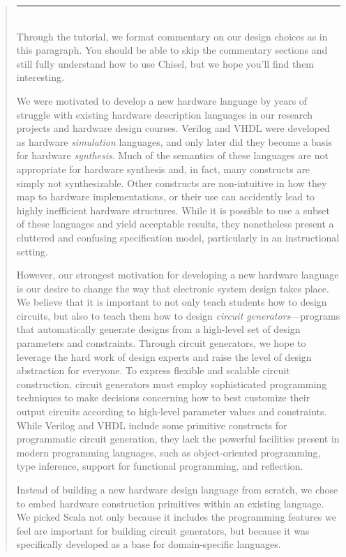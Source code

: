 \documentclass[twocolumn,10pt]{article}
\newenvironment{commentary}
{ \vspace{-0.1in}
  \begin{quotation}
  \noindent
  \small \em
  \rule{\linewidth}{1pt}\\
}
{
  \end{quotation}
}
\begin{document}
\begin{commentary}
Through the tutorial, we format commentary on our design choices as in
this paragraph.  You should be able to skip the commentary sections
and still fully understand how to use Chisel, but we hope you'll find
them interesting.

We were motivated to develop a new hardware language by years of
struggle with existing hardware description languages in our research
projects and hardware design courses.  Verilog and VHDL were developed
as hardware {\em simulation} languages, and only later did they become
a basis for hardware {\em synthesis}.  Much of the semantics of these
languages are not appropriate for hardware synthesis and, in fact,
many constructs are simply not synthesizable.  Other constructs are
non-intuitive in how they map to hardware implementations, or their
use can accidently lead to highly inefficient hardware structures.
While it is possible to use a subset of these languages and yield
acceptable results, they nonetheless present a cluttered and confusing
specification model, particularly in an instructional setting.

However, our strongest motivation for developing a new hardware
language is our desire to change the way that electronic system design
takes place.  We believe that it is important to not only teach
students how to design circuits, but also to teach them how to design
{\em circuit generators}---programs that automatically generate
designs from a high-level set of design parameters and constraints.
Through circuit generators, we hope to leverage the hard work of
design experts and raise the level of design abstraction for everyone.
To express flexible and scalable circuit construction, circuit
generators must employ sophisticated programming techniques to make
decisions concerning how to best customize their output circuits
according to high-level parameter values and constraints.  While
Verilog and VHDL include some primitive constructs for programmatic
circuit generation, they lack the powerful facilities present in
modern programming languages, such as object-oriented programming,
type inference, support for functional programming, and reflection.

Instead of building a new hardware design language from scratch, we
chose to embed hardware construction primitives within an existing
language.  We picked Scala not only because it includes the
programming features we feel are important for building circuit
generators, but because it was specifically developed as a base for
domain-specific languages.
\end{commentary}
\end{document}
